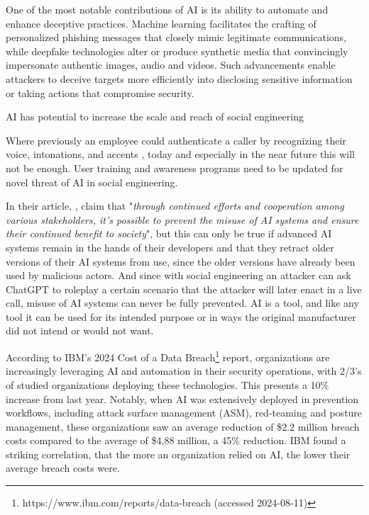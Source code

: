 One of the most notable contributions of AI is its ability to automate and enhance deceptive practices. Machine learning facilitates the crafting of personalized phishing messages that closely mimic legitimate communications, while deepfake technologies alter or produce synthetic media that convincingly impersonate authentic images, audio and videos. Such advancements enable attackers to deceive targets more efficiently into disclosing sensitive information or taking actions that compromise security.

AI has potential to increase the scale and reach of social engineering \citep{blauthArtificialIntelligenceCrime2022}

Where previously an employee could authenticate a caller by recognizing their voice, intonations, and accents \citep{mitnickArtDeceptionControlling2003}, today and especially in the near future this will not be enough. User training and awareness programs need to be updated for novel threat of AI in social engineering.

In their article, \cite{guptaFromChatGPTtoThreatGPT2023}, claim that "\textit{through continued efforts and cooperation among various stakeholders, it’s possible to prevent the misuse of AI systems and ensure their continued benefit to society}", but this can only be true if advanced AI systems remain in the hands of their developers and that they retract older versions of their AI systems from use, since the older versions have already been used by malicious actors. And since with social engineering an attacker can ask ChatGPT to roleplay a certain scenario that the attacker will later enact in a live call, misuse of AI systems can never be fully prevented. AI is a tool, and like any tool it can be used for its intended purpose or in ways the original manufacturer did not intend or would not want.

According to IBM's 2024 Cost of a Data Breach\footnote{https://www.ibm.com/reports/data-breach (accessed 2024-08-11)} report, organizations are increasingly leveraging AI and automation in their security operations, with 2/3's of studied organizations deploying these technologies. This presents a 10\% increase from last year. Notably, when AI was extensively deployed in prevention workflows, including attack surface management (ASM), red-teaming and posture management, these organizations saw an average reduction of \$2.2 million breach costs compared to the average of \$4,88 million, a 45\% reduction. IBM found a striking correlation, that the more an organization relied on AI, the lower their average breach costs were.

